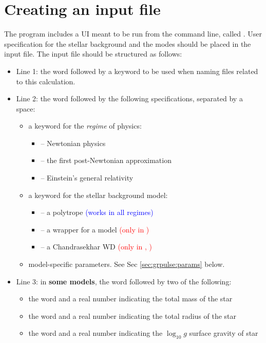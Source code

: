 \section{Creating an input file}
The program includes a UI meant to be run from the command line, called .  User specification for the stellar background and the modes should be placed in the input file.  The input file should be structured as follows:
\begin{itemize}
	\item Line 1: the word  followed by a keyword to be used when naming files related to this calculation.
	\item Line 2: the word  followed by the following specifications, separated by a space:
		\begin{itemize}
			\item a keyword for the \emph{regime} of physics:
				\begin{itemize}
					\item {} -- Newtonian physics
					\item {} -- the first post-Newtonian approximation
					\item {} -- Einstein's general relativity
				\end{itemize}
			\item a keyword for the stellar background model:
				\begin{itemize}
					\item {} -- a polytrope \textcolor{blue}{(works in all regimes)}
					\item {} -- a wrapper for a  model \textcolor{red}{(only in )}
					\item {} -- a Chandrasekhar WD \textcolor{red}{(only in , )}
				\end{itemize}
			\item model-specific parameters.  See Sec \ref{sec:grpulse:params} below.
		\end{itemize}
	\item Line 3: in {\bf some models}, the word  followed by two of the following:
		\begin{itemize}
			\item the word  and a real number indicating the total mass of the star
			\item the word  and a real number indicating the total radius of the star
			\item the word  and a real number indicating the $\log_{10} g$ surface gravity of star

\end{itemize}
\end{itemize}
